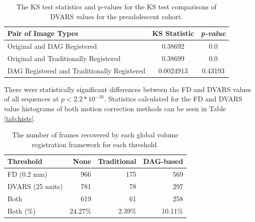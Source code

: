 \begin{table}[]
\begin{tabular}{|l|c|c|}
\caption{The KS test statistics and p-values for the KS test comparisons of DVARS values for the preadolescent cohort.}
\hline
\textbf{Pair of Image Types} & \multicolumn{1}{l|}{\textbf{KS Statistic}} & \multicolumn{1}{l|}{\textit{\textbf{p-value}}} \\ \hline
Original and DAG Registered                 & 0.38692   & 0.0     \\ \hline
Original and Traditionally Registered       & 0.38699   & 0.0     \\ \hline
DAG Registered and Traditionally Registered & 0.0024913 & 0.43193 \\ \hline
\end{tabular}
\end{table}

There were statistically significant differences between the FD and DVARS values of all sequences at $p < 2.2*10^{-16}$. Statistics calculated for the FD and DVARS value histograms of both motion correction methods can be seen in Table \ref{tab:hists}. 

\begin{table}[th]
\centering
\caption{The number of frames recovered by each global volume registration framework for each threshold.}
\label{tab:thresholds}
\begin{tabular}{|l|r|r|r|}
\hline
\textbf{Threshold} & \textbf{None} & \textbf{Traditional} & \textbf{DAG-based} \\ \hline
FD (0.2 mm)        & 966           & 175                  & 569                \\ \hline
DVARS (25 units)   & 781           & 78                   & 297                \\ \hline
Both               & 619           & 61                   & 258                \\ \hline
Both (\%)          & 24.27\%       & 2.39\%               & 10.11\%            \\ \hline
\end{tabular}
\end{table}


